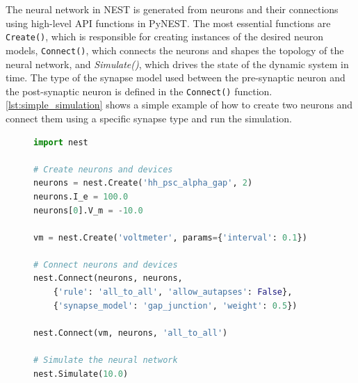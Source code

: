 The neural network in NEST is generated from neurons and their connections using high-level API functions in PyNEST. The most essential functions are \texttt{Create()}, which is responsible for creating instances of the desired neuron models, \texttt{Connect()}, which connects the neurons and shapes the topology of the neural network, and \emph{Simulate()}, which drives the state of the dynamic system in time. The type of the synapse model used between the pre-synaptic neuron and the post-synaptic neuron is defined in the \texttt{Connect()} function. \autoref{lst:simple_simulation} shows a simple example of how to create two neurons and connect them using a specific synapse type and run the simulation.\\

\begin{figure}[ht!]
  \centering
\begin{lstlisting}[language=Python, label=lst:simple_simulation, caption={Every simulation script using PyNEST starts with importing the \texttt{nest} module in Python. In line 4, we create two Hodgkin-Huxley neurons as instances of the \emph{hh\_psc\_alpha\_gap} model. In line 5, we set a background current of 100.0 pA for both neurons. Line 6 modifies the initial membrane potentials of the first neuron instance to be at -10.0 mV. In line 8, we create a \texttt{voltmeter} to record the membrane potential of both neurons. In line 11, we connect the first neuron with the second neuron, and vice-versa using the \emph{gap\_junction} synapse model. Finally, we connect the voltmeter to the neurons to record their membrane potential over the course of the simulation in line 15 and run the simulation for 10.0 milliseconds in the last line by calling \texttt{Simulate()}.}, captionpos=b]
import nest

# Create neurons and devices
neurons = nest.Create('hh_psc_alpha_gap', 2)
neurons.I_e = 100.0
neurons[0].V_m = -10.0

vm = nest.Create('voltmeter', params={'interval': 0.1})

# Connect neurons and devices
nest.Connect(neurons, neurons,
    {'rule': 'all_to_all', 'allow_autapses': False},
    {'synapse_model': 'gap_junction', 'weight': 0.5})

nest.Connect(vm, neurons, 'all_to_all')

# Simulate the neural network
nest.Simulate(10.0)
\end{lstlisting}
\end{figure}

